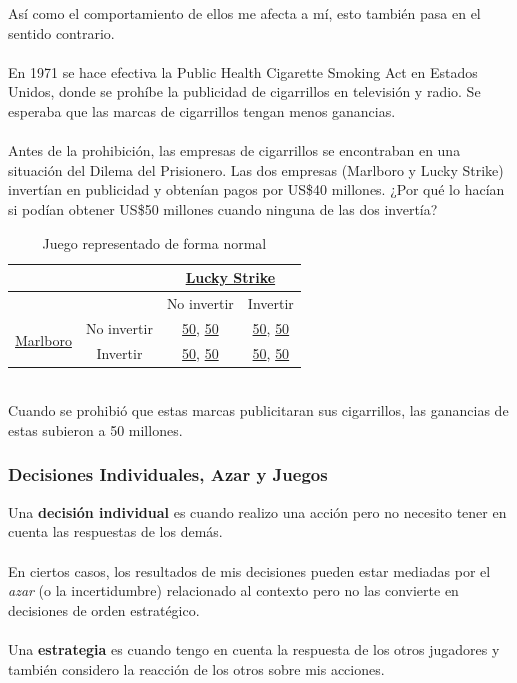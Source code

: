 \documentclass{article}
\newcommand{\ulcolor}[2][Red]{\setulcolor{#1}\ul{#2}}
\begin{document}
                Así como el comportamiento de ellos me afecta a mí, esto también pasa en el sentido contrario. \\
                \\
                En 1971 se hace efectiva la Public Health Cigarette Smoking Act en Estados Unidos, donde se prohíbe la publicidad de cigarrillos en televisión y radio. Se esperaba que las marcas de cigarrillos tengan menos ganancias. \\
                \\
                Antes de la prohibición, las empresas de cigarrillos se encontraban en una situación del Dilema del Prisionero. Las dos empresas (Marlboro y Lucky Strike) invertían en publicidad y obtenían pagos por US\$40 millones. ¿Por qué lo hacían si podían obtener US\$50 millones cuando ninguna de las dos invertía? 
                \begin{table}[h]
                    \centering
                        \begin{tabular}{|c|c|c|c|}
                        \hline
                                                &               & \multicolumn{2}{c|}{\ulcolor[Blue]{Lucky Strike}}                                  \\ \hline
                                                &               & No invertir                           & Invertir                              \\ \hline
                        \multirow{2}{*}{\ulcolor[Red]{Marlboro}} 
                                                & No invertir   & \ulcolor[Red]{50}, \ulcolor[Blue]{50} & \ulcolor[Red]{50}, \ulcolor[Blue]{50} \\ \cline{2-4} 
                                                & Invertir      & \ulcolor[Red]{50}, \ulcolor[Blue]{50} & \ulcolor[Red]{50}, \ulcolor[Blue]{50} \\\hline
                        \end{tabular}
                    \caption{Juego representado de forma normal}
                \end{table} \\
                Cuando se prohibió que estas marcas publicitaran sus cigarrillos, las ganancias de estas subieron a 50 millones.
            \subsubsection*{Decisiones Individuales, Azar y Juegos}
                Una \textbf{decisión individual} es cuando realizo una acción pero no necesito tener en cuenta las respuestas de los demás. \\
                \\
                En ciertos casos, los resultados de mis decisiones pueden estar mediadas por el \emph{azar} (o la incertidumbre) relacionado al contexto pero no las convierte en decisiones de orden estratégico. \\
                \\
                Una \textbf{estrategia} es cuando tengo en cuenta la respuesta de los otros jugadores y también considero la reacción de los otros sobre mis acciones.
\end{document}
